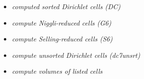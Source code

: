 \documentclass[preprint]{iucr}              %
\numberwithin{equation}{section}
\begin{document}
\begin{itemize}
	\cite{Bernstein2023}
	\item 	\emph{computed sorted Dirichlet cells (DC)}\\
	\cite{Bernstein2023}
	\item 	\emph{compute Niggli-reduced cells (G6)}\\
	\cite{Andrews2014}
	\item 	\emph{compute Selling-reduced cells (S6)}\\
	\cite{Andrews2019b}
	\item 	\emph{compute unsorted Dirichlet cells (dc7unsrt)}\\
	\cite{Andrews2019b}
	\item 	\emph{compute volumes of listed cells}
\end{itemize}	

%			
			
			
			
			
			
			
			
			
			
			
			
			
			
		
\end{document}
